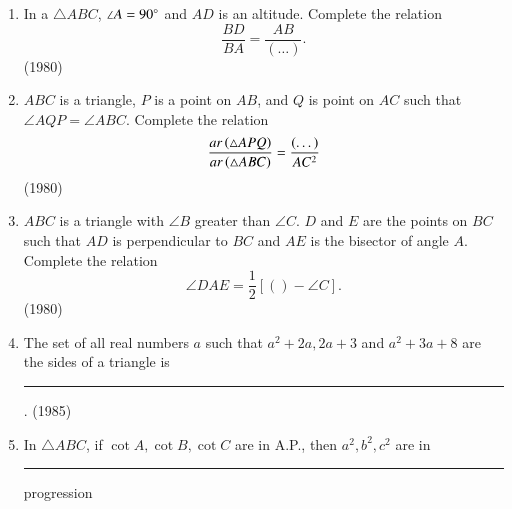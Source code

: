 \begin{enumerate}[label=\thesubsection.\arabic*,ref=\thesubsection.\theenumi]
    \item In a $\triangle ABC$, $\angle A=90\degree$ and $AD$ is an altitude. Complete the relation
    $$\frac{BD}{BA} = \frac{AB}{(\dots)}.$$
    \hfill (1980)
    
    \item $ABC$ is a triangle, $P$ is a point on $AB$, and $Q$ is point on $AC$ such that $\angle AQP = \angle ABC$. Complete the relation
	    $$\frac{ar\left(\triangle APQ\right)}{ar\left(\triangle ABC\right)} =\frac{(\dots)}{AC^2}$$
    \hfill (1980)
    
    \item $ABC$ is a triangle with $\angle B $ greater than $\angle C$.
    $D$ and $E$ are the points on $BC$ such that $AD$ is perpendicular to $BC$ and $AE$ is the bisector of angle $A$. Complete the relation
    $$\angle DAE = \frac{1}{2} [( ) - \angle C].$$
    \hfill (1980)
    \item The set of all real numbers $a$ such that $a^2 + 2a, 2a + 3$ and $a^2 + 3a + 8$ are the sides of a triangle is \rule{1cm}{0.1pt}.
    \hfill (1985)
    \item In   $\triangle ABC$, if $\cot A, \cot B, \cot C$ are in A.P., then $a^2,b^2,c^2$ are in \rule{1cm}{0.1pt} progression 


\end{enumerate}
